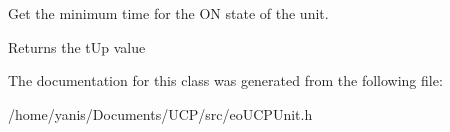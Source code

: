 \-Get the minimum time for the \-O\-N state of the unit. 

\begin{DoxyReturn}{\-Returns}
the t\-Up value 
\end{DoxyReturn}


\-The documentation for this class was generated from the following file\-:\begin{DoxyCompactItemize}
\item 
/home/yanis/\-Documents/\-U\-C\-P/src/eo\-U\-C\-P\-Unit.\-h\end{DoxyCompactItemize}
